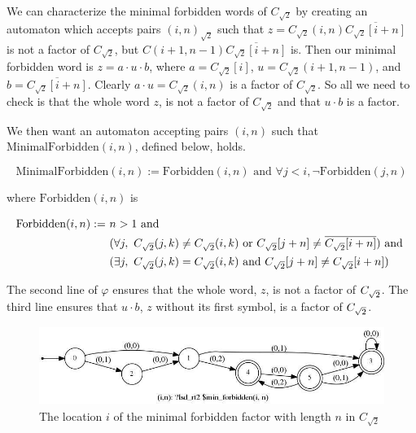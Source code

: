 We can characterize the minimal forbidden words of $C_{\sqrt{2}}$ by creating an automaton which accepts pairs $(i,n)_{\sqrt{2}}$ such that $z = C_{\sqrt{2}}(i,n) \overline{C_{\sqrt{2}}[i + n]}$ is not a factor of $C_{\sqrt{2}}$, but $C(i + 1,n-1)\overline{C_{\sqrt{2}}[i+n]}$ is.
Then our minimal forbidden word is $z = a \cdot u \cdot b$, where $a = C_{\sqrt{2}}[i]$, $u = C_{\sqrt{2}}(i+1,n-1)$, and $b = \overline{C_{\sqrt{2}}[i + n]}$.
Clearly $a \cdot u = C_{\sqrt{2}}(i,n)$ is a factor of $C_{\sqrt{2}}$.
So all we need to check is that the whole word $z$, is not a factor of $C_{\sqrt{2}}$ and that $u \cdot b$ is a factor.

We then want an automaton accepting pairs $(i, n)$ such that $\text{MinimalForbidden}(i, n)$, defined below, holds.

\begin{equation*}
    \text{MinimalForbidden}(i, n) := \text{Forbidden}(i, n) \text{ and } \forall j < i, \neg \text{Forbidden}(j, n)
\end{equation*}

where $\text{Forbidden}(i,n)$ is

\begin{equation*}
\begin{split}
    \text{Forbidden}(i, n) :=~& n > 1 \text{ and }  \\
                     & (\forall j, ~C_{\sqrt{2}}(j,k) \neq C_{\sqrt{2}}(i,k) \text{ or }
                                  C_{\sqrt{2}}[j + n] \neq \overline{C_{\sqrt{2}}[i + n]}) ~ \text{and} ~ \\
                     & (\exists j, ~C_{\sqrt{2}}(j,k) = C_{\sqrt{2}}(i,k) ~ \text{and} ~
                                C_{\sqrt{2}}[j + n] \neq C_{\sqrt{2}}[i + n])
\end{split}
\end{equation*}

The second line of $\varphi$ ensures that the whole word, $z$, is not a factor of $C_{\sqrt{2}}$.
The third line ensures that $u \cdot b$, $z$ without its first symbol, is a factor of $C_{\sqrt{2}}$.

\begin{figure}
    \centering
    \includegraphics[width=\textwidth]{paper_images/minimal_forbidden_words.jpg}
    \caption{The location $i$ of the minimal forbidden factor with length $n$ in $C_{\sqrt{2}}$}
    \label{fig:min_forbidden_rt2}
\end{figure}

